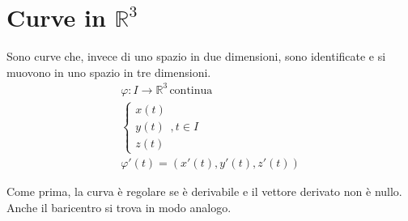 \section{Curve in $\mathbb{R}^3$}
Sono curve che, invece di uno spazio in due dimensioni, sono identificate e si muovono in uno spazio in tre dimensioni.
\begin{gather}
	\varphi:I\rightarrow\mathbb{R}^3\, \text{continua} \\
	\begin{cases}
		x(t) \\
		y(t) \\
		z(t)
	\end{cases}, t\in I \\
	\varphi'(t)=(x'(t), y'(t), z'(t))
\end{gather}

Come prima, la curva è regolare se è derivabile e il vettore derivato non è nullo. Anche il baricentro si trova in modo analogo.

